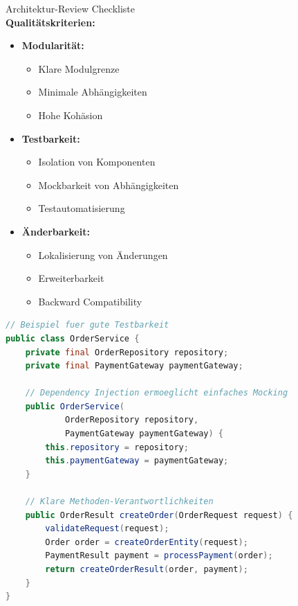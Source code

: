 \begin{example2}{Architektur-Review Checkliste}\\
\textbf{Qualitätskriterien:}

\begin{itemize}
    \item \textbf{Modularität:}
    \begin{itemize}
        \item Klare Modulgrenze
        \item Minimale Abhängigkeiten
        \item Hohe Kohäsion
    \end{itemize}
    
    \item \textbf{Testbarkeit:}
    \begin{itemize}
        \item Isolation von Komponenten
        \item Mockbarkeit von Abhängigkeiten
        \item Testautomatisierung
    \end{itemize}
    
    \item \textbf{Änderbarkeit:}
    \begin{itemize}
        \item Lokalisierung von Änderungen
        \item Erweiterbarkeit
        \item Backward Compatibility
    \end{itemize}
\end{itemize}

\begin{lstlisting}[language=Java, style=basesmol]
// Beispiel fuer gute Testbarkeit
public class OrderService {
    private final OrderRepository repository;
    private final PaymentGateway paymentGateway;
    
    // Dependency Injection ermoeglicht einfaches Mocking
    public OrderService(
            OrderRepository repository,
            PaymentGateway paymentGateway) {
        this.repository = repository;
        this.paymentGateway = paymentGateway;
    }
    
    // Klare Methoden-Verantwortlichkeiten
    public OrderResult createOrder(OrderRequest request) {
        validateRequest(request);
        Order order = createOrderEntity(request);
        PaymentResult payment = processPayment(order);
        return createOrderResult(order, payment);
    }
}
\end{lstlisting}
\end{example2}



